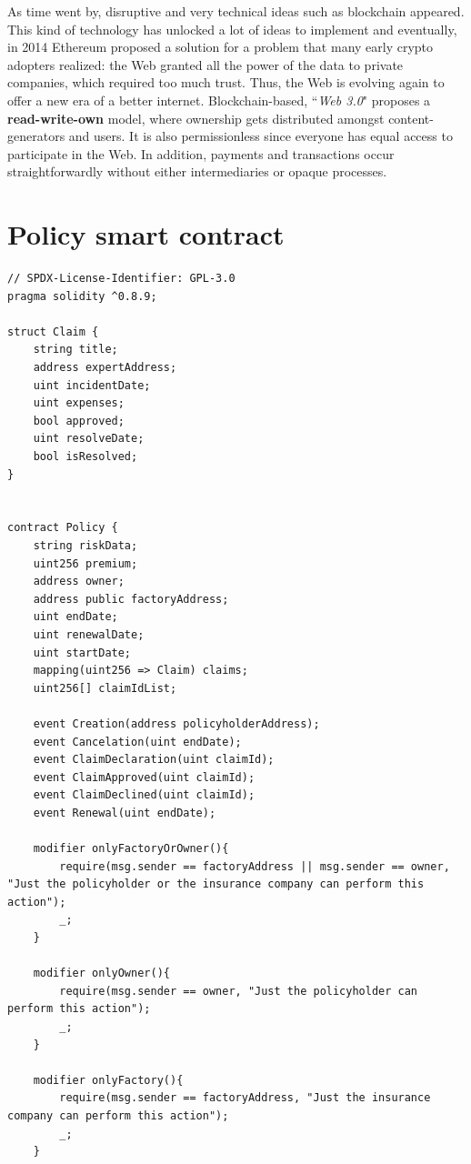 \documentclass[a4paper,12pt]{article}
\begin{document}
\begin{appendices}
{As time went by, disruptive and very technical ideas such as blockchain appeared. This kind of technology has unlocked a lot of ideas to implement and eventually, in 2014 Ethereum proposed a solution for a problem that many early crypto adopters realized: the Web granted all the power of the data to private companies, which required too much trust. Thus, the Web is evolving again to offer a new era of a better internet. Blockchain-based, ``\textit{Web 3.0}" proposes a \textbf{read-write-own} model, where ownership gets distributed amongst content-generators and users. It is also permissionless since everyone has equal access to participate in the Web. In addition, payments and transactions occur straightforwardly without either intermediaries or opaque processes.

}

\section{Policy smart contract}
\label{appendix:policy-sc}
\begin{lstlisting}
// SPDX-License-Identifier: GPL-3.0
pragma solidity ^0.8.9;

struct Claim {
    string title;
    address expertAddress;
    uint incidentDate;
    uint expenses;
    bool approved;
    uint resolveDate;
    bool isResolved;
}


contract Policy {
    string riskData;
    uint256 premium;
    address owner;
    address public factoryAddress;
    uint endDate;
    uint renewalDate;
    uint startDate;
    mapping(uint256 => Claim) claims;
    uint256[] claimIdList;

    event Creation(address policyholderAddress);
    event Cancelation(uint endDate);
    event ClaimDeclaration(uint claimId);
    event ClaimApproved(uint claimId);
    event ClaimDeclined(uint claimId);
    event Renewal(uint endDate);

    modifier onlyFactoryOrOwner(){
        require(msg.sender == factoryAddress || msg.sender == owner, "Just the policyholder or the insurance company can perform this action");
        _;
    }

    modifier onlyOwner(){
        require(msg.sender == owner, "Just the policyholder can perform this action");
        _;
    }

    modifier onlyFactory(){
        require(msg.sender == factoryAddress, "Just the insurance company can perform this action");
        _;
    }


\end{lstlisting}
\end{appendices}
\end{document}
